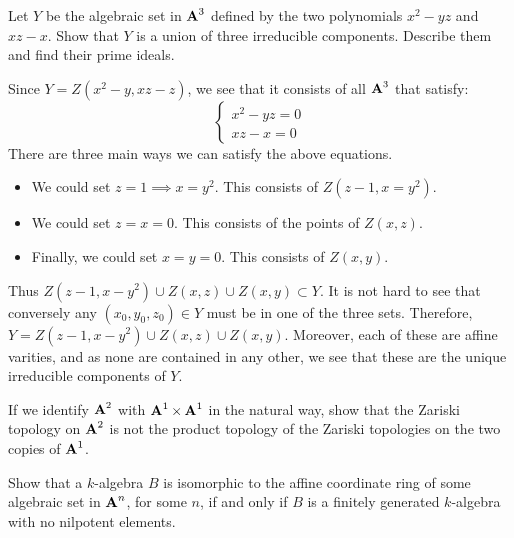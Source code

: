 \documentclass[10pt]{amsart}
\begin{document}
\begin{exercise}[1.3]
    Let $Y$ be the algebraic set in $\aa^3$ defined by the two polynomials
    $x^2 - yz$ and $xz - x$.
    Show that $Y$ is a union of three irreducible components.
    Describe them and find their prime ideals.
\end{exercise}

\begin{solution}
    \begin{luke}
    Since $Y = Z(x^2 - y, xz - z)$,  we see that it consists of all $\aa^3$ that 
    satisfy:
    \[
        \begin{cases}
            x^2 - yz = 0\\
            xz - x = 0
        \end{cases}
    \]
    There are three main ways we can satisfy the above equations. 
    \begin{itemize}
        \item We could set $z = 1 \implies x = y^2$. This consists of $Z(z - 1, x = y^2)$.
        \item We could set $z = x = 0$. This consists of the points of $Z(x, z)$.
        \item Finally, we could set $x = y = 0$. This consists of $Z(x,y)$. 
    \end{itemize}
    Thus $Z(z - 1, x - y^2) \cup Z(x, z) \cup Z(x, y) \subset Y$. It is not 
    hard to see that conversely any $(x_0, y_0, z_0) \in Y$ must be in 
    one of the three sets. Therefore, $Y = Z(z - 1, x - y^2) \cup Z(x, z) \cup Z(x, y)$. 
    Moreover, each of these are affine varities, and as none are contained in any 
    other, we see that these are the unique irreducible components of $Y$.
    \end{luke}

\end{solution}

\begin{exercise}[1.4]
    If we identify $\aa^2$ with $\aa^1 \times \aa^1$ in the natural way, show
    that the Zariski topology on $\aa^2$ is not the product topology of the
    Zariski topologies on the two copies of $\aa^1$.
\end{exercise}

\begin{solution}

\end{solution}

\begin{exercise}[1.5]
    Show that a $k$-algebra $B$ is isomorphic to the affine coordinate ring of
    some algebraic set in $\aa^n$, for some $n$, if and only if $B$ is a
    finitely generated $k$-algebra with no nilpotent elements.
\end{exercise}
\end{document}
